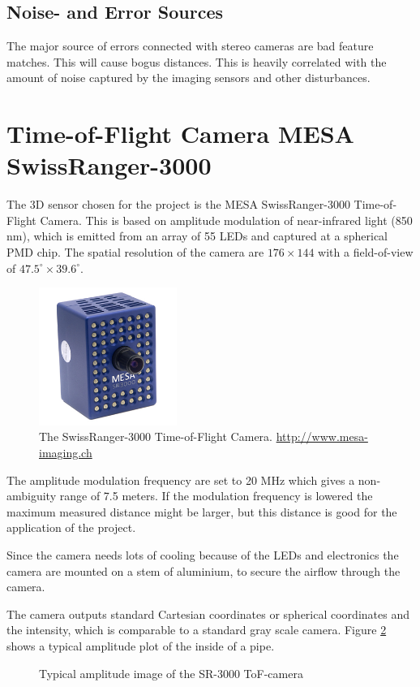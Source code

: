 \subsection{Noise- and Error Sources}
The major source of errors connected with stereo cameras are bad feature matches. This
will cause bogus distances. This is heavily correlated with the amount of noise captured
by the imaging sensors and other disturbances.




\section{Time-of-Flight Camera MESA SwissRanger-3000}
The 3D sensor chosen for the project is the MESA SwissRanger-3000 Time-of-Flight Camera.
This is based on amplitude modulation of near-infrared light (850 nm), which is emitted from an
array of 55 LEDs and captured at a spherical PMD chip. The spatial resolution of the camera
are $176\times144$ with a field-of-view of $47.5^\circ \times 39.6^\circ$. 
\begin{figure}[htbp]
    \centering
    \includegraphics[width=0.4\textwidth]{pics/sr3000}
    \caption{The SwissRanger-3000 Time-of-Flight Camera. \url{http://www.mesa-imaging.ch}}
    \label{chap3:fig-sr3000}
\end{figure}
The amplitude modulation frequency are set to 20 MHz which gives a non-ambiguity range of
7.5 meters. If the modulation frequency is lowered the maximum measured distance might be
larger, but this distance is good for the application of the project. 

Since the camera needs lots of cooling because of the LEDs and electronics the camera are
mounted on a stem of aluminium, to secure the airflow through the camera. 

The camera outputs standard Cartesian coordinates or spherical coordinates and the
intensity, which is comparable to a standard gray scale camera. Figure 
\ref{chap3:fig-tof-amppicture} shows a typical amplitude plot of the inside of a pipe.
\begin{figure}[htbp]
    \centering
    \caption{Typical amplitude image of the SR-3000 ToF-camera}
    \label{chap3:fig-tof-amppicture}
\end{figure}


